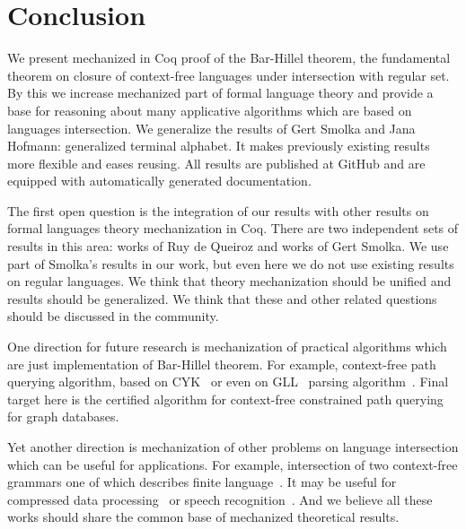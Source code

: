 \section{Conclusion}
\label{sec:conclusion}

We present mechanized in Coq proof of the Bar-Hillel theorem, the fundamental theorem on closure of context-free languages under intersection with regular set.
By this we increase mechanized part of formal language theory and provide a base for reasoning about many applicative algorithms which are based on languages intersection.
We generalize the results of Gert Smolka and Jana Hofmann: generalized terminal alphabet. 
It makes previously existing results more flexible and eases reusing.
All results are published at GitHub and are equipped with automatically generated documentation.

The first open question is the integration of our results with other results on formal languages theory mechanization in Coq. 
There are two independent sets of results in this area: works of Ruy de Queiroz and works of Gert Smolka.
We use part of Smolka's results in our work, but even here we do not use existing results on regular languages.
We think that theory mechanization should be unified and results should be generalized.
We think that these and other related questions should be discussed in the community.

One direction for future research is mechanization of practical algorithms which are just implementation of Bar-Hillel theorem.
For example, context-free path querying algorithm, based on CYK~\cite{hellingsPathQuerying,zhang2016context} or even on GLL~\cite{scott2010gll} parsing algorithm~\cite{grigorev2016context}.
Final target here is the certified algorithm for context-free constrained path querying for graph databases.

Yet another direction is mechanization of other problems on language intersection which can be useful for applications.
For example, intersection of two context-free grammars one of which describes finite language~\cite{nederhof2002parsing, nederhof2004language}.
It may be useful for compressed data processing~\cite{Lohrey2012AlgorithmicsOS} or speech recognition~\cite{Nederhof:2002:PNC:1073083.1073104,NEDERHOF2004172}.
And we believe all these works should share the common base of mechanized theoretical results.



